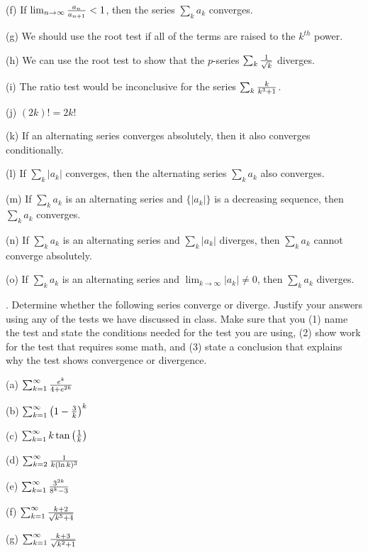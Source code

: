 \documentclass[12pt]{article}
\begin{document}
\noindent (f) If $\lim_{n \to \infty} {{a_n}\over{a_{n+1}}}< 1$, then the 
series $\sum_k a_k$ converges.

\noindent (g) We should use the root test if all of the terms are raised 
to 
the $k^{th}$ power.

\noindent (h) We can use the root test to show that the $p$-series $\sum_k 
{{1}\over{\sqrt{k}}}$ diverges.

\noindent (i) The ratio test would be inconclusive for the series $\sum_k 
{{k}\over{k^3+1}}$.

\noindent (j) $(2k)!=2k!$

\noindent (k) If an alternating series converges absolutely, then it also 
converges conditionally.

\noindent (l) If $\sum_k |a_k|$ converges, then the alternating series 
$\sum_k a_k$ also converges.

\noindent (m) If $\sum_k a_k$ is an alternating series and $\{ |a_k| \}$ 
is a decreasing sequence, then $\sum_k a_k$ 
converges.

\noindent (n) If $\sum_k a_k$ is an alternating series and $\sum_k |a_k|$ 
diverges, then $\sum_k a_k$ cannot converge 
absolutely.

\noindent (o) If $\sum_k a_k$ is an alternating series and $\lim_{k \to 
\infty} |a_k| \neq 0$, then $\sum_k a_k$ diverges.

\bigskip
{}. Determine whether the following series converge or 
diverge.  Justify your answers using any of the tests we have 
discussed in class.  Make sure that you (1) name the test and 
state the conditions needed for the test you are using, (2) show work for 
the test that requires some math, and (3) state a conclusion that 
explains why the test shows convergence or divergence.

\noindent (a)  $\sum_{k=1}^{\infty} {{e^k}\over{4+e^{2k}}}$

\smallskip
\noindent (b) $\sum_{k=1}^{\infty} \left ( 1 - {{3}\over{k}} \right )^k$

\smallskip
\noindent (c)  $\sum_{k=1}^{\infty} k \tan \left ( {{1}\over{k}} \right 
)$

\smallskip
\noindent (d) $\sum_{k=2}^{\infty} {{1}\over{k (\ln k)^3}}$

\smallskip
\noindent (e) $\sum_{k=1}^{\infty} {{3^{2k}}\over{8^k - 3}}$

\smallskip
\noindent (f) $\sum_{k=1}^{\infty} {{k+2}\over{\sqrt{k^5 + 4}}}$

\smallskip
\noindent (g) $\sum_{k=1}^{\infty} {{k+3}\over{\sqrt{k^2+1}}}$
\end{document}

